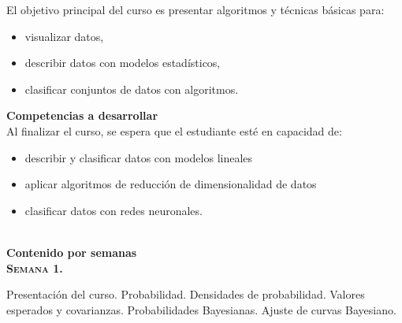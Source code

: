 \documentclass[letterpaper,10pt,onecolumn]{article}
\begin{document}
\noindent\normalsize El objetivo principal del curso es presentar
algoritmos y t\'ecnicas b\'asicas para:

\begin{itemize}
\item visualizar datos,
\\[-0.6cm]
\item describir datos con modelos estad\'isticos,
\\[-0.6cm]
\item clasificar conjuntos de datos con algoritmos.
\\[-0.6cm]
\end{itemize} 
\vspace*{0.5cm} 

\noindent\textbf{\large {} \quad Competencias a
  desarrollar}\\[-0.2cm] 


\noindent\normalsize Al finalizar el curso, se espera que el
estudiante est\'e en capacidad de: 

\begin{itemize}
\item describir y clasificar datos con modelos lineales \\[-0.6cm]   
\item aplicar algoritmos de reducci\'on de dimensionalidad de datos\\[-0.6cm]  
\item clasificar datos con redes neuronales.\\[-0.6cm]
\\[-0.6cm]  
\end{itemize}

\vspace*{0.5cm} 

\noindent\textbf{\large {} \quad Contenido por
  semanas}\\[-0.2cm]  


\noindent\textbf{\textsc{Semana 1.}} 

Presentaci\'on del curso. Probabilidad. Densidades de probabilidad. 
Valores esperados y covarianzas. Probabilidades Bayesianas.
Ajuste de curvas Bayesiano.
\\[-0.3cm] %
\end{document}
